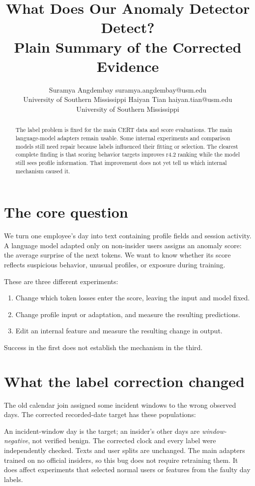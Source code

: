 \documentclass[10pt]{article}
\title{What Does Our Anomaly Detector Detect?\\Plain Summary of the Corrected Evidence}
\author{\name Suramya Angdembay \email suramya.angdembay@usm.edu\\\addr University of Southern Mississippi
\AND\name Haiyan Tian \email haiyan.tian@usm.edu\\\addr University of Southern Mississippi}
\begin{document}
\maketitle
\begin{abstract}
The label problem is fixed for the main CERT data and score evaluations.
The main language-model adapters remain usable. Some internal experiments and
comparison models still need repair because labels influenced their fitting or
selection. The clearest complete finding is that scoring behavior targets
improves r4.2 ranking while the model still sees profile information. That
improvement does not yet tell us which internal mechanism caused it.
\end{abstract}
\section{The core question}
We turn one employee's day into text containing profile fields and session
activity. A language model adapted only on non-insider users assigns an anomaly
score: the average surprise of the next tokens. We want to know whether its
score reflects suspicious behavior, unusual profiles, or exposure during training.

These are three different experiments:
\begin{enumerate}
\item Change which token losses enter the score, leaving the input and model fixed.
\item Change profile input or adaptation, and measure the resulting predictions.
\item Edit an internal feature and measure the resulting change in output.
\end{enumerate}
Success in the first does not establish the mechanism in the third.

\section{What the label correction changed}
The old calendar join assigned some incident windows to the wrong observed days.
The corrected recorded-date target has these populations:
\begin{center}\end{center}
An incident-window day is the target; an insider's other days are
\emph{window-negative}, not verified benign. The corrected clock and every label
were independently checked. Texts and user splits are unchanged. The main
adapters trained on no official insiders, so this bug does not require retraining
them. It does affect experiments that selected normal users or features from the
faulty day labels.
\end{document}
